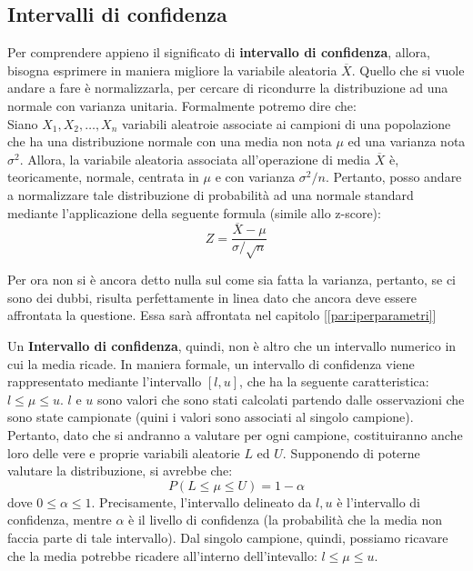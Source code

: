 \subsection{Intervalli di confidenza}
Per comprendere appieno il significato di \textbf{intervallo di confidenza}, allora, bisogna esprimere in maniera migliore la variabile aleatoria \(\overline{X}\). Quello che si vuole andare a fare è normalizzarla, per cercare di ricondurre la distribuzione ad una normale con varianza unitaria. 
Formalmente potremo dire che:
\\
Siano \(X_1,X_2, \dots, X_n\) variabili aleatroie associate ai campioni di una popolazione che ha una distribuzione normale con una media non nota \(\mu\) ed una varianza nota \(\sigma^2\). Allora, la variabile aleatoria associata all'operazione di media \(\overline{X}\) è, teoricamente, normale, centrata in \(\mu\) e con varianza \(\sigma^2/n\). Pertanto, posso andare a normalizzare tale distribuzione di probabilità ad una normale standard mediante l'applicazione della seguente formula (simile allo z-score):
\[
Z = \frac{\overline{X} - \mu}{\sigma/\sqrt{n}}
\]

\begin{warn}
Per ora non si è ancora detto nulla sul come sia fatta la varianza, pertanto, se ci sono dei dubbi, risulta perfettamente in linea dato che ancora deve essere affrontata la questione. Essa sarà affrontata nel capitolo [\ref{par:iperparametri}]
\end{warn}

Un \textbf{Intervallo di confidenza}, quindi, non è altro che un intervallo numerico in cui la media ricade. In maniera formale, un intervallo di confidenza viene rappresentato mediante l'intervallo \([l,u]\), che ha la seguente caratteristica: \(l\leq\mu\leq u\). \(l\) e \(u\) sono valori che sono stati calcolati partendo dalle osservazioni che sono state campionate (quini i valori sono associati al singolo campione). Pertanto, dato che si andranno a valutare per ogni campione, costituiranno anche loro delle vere e proprie variabili aleatorie \(L\) ed \(U\). Supponendo di poterne valutare la distribuzione, si avrebbe che:
\[
P(L\leq \mu \leq U) = 1-\alpha
\]
dove \(0 \leq \alpha \leq 1\). Precisamente, l'intervallo delineato da \(l,u\) è l'intervallo di confidenza, mentre \(\alpha\) è il livello di confidenza (la probabilità che la media non faccia parte di tale intervallo). Dal singolo campione, quindi, possiamo ricavare che la media potrebbe ricadere all'interno dell'intevallo: \(l \leq \mu \leq u\). 

